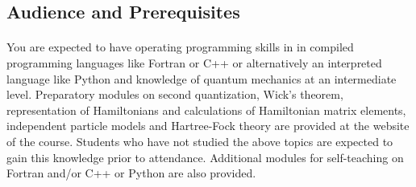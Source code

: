 \documentclass[%
oneside,                 %
final,                   %
10pt]{article}
\begin{document}
\noindent




\subsection{Audience and Prerequisites}

\paragraph{}

You are expected to have operating programming skills in in
compiled programming languages like Fortran or C++ or alternatively an
interpreted language like Python and knowledge of quantum mechanics at
an intermediate level.  Preparatory modules on second quantization,
Wick's theorem, representation of Hamiltonians and calculations of
Hamiltonian matrix elements, independent particle models and
Hartree-Fock theory are provided at the website of the course.
Students who have not studied the above topics are expected to gain
this knowledge prior to attendance.  Additional modules for
self-teaching on Fortran and/or C++ or Python are also provided.













\end{document}
